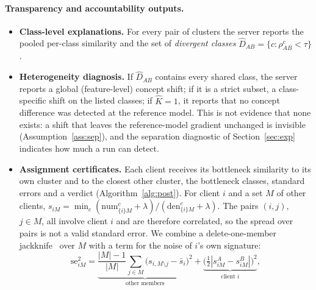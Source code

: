 \documentclass[pdflatex,sn-apa]{sn-jnl}
\theoremstyle{thmstyleone}
\theoremstyle{thmstylethree}
\begin{document}
\paragraph{Transparency and accountability outputs.}\label{sec:outputs}
\begin{itemize}[leftmargin=*,itemsep=1pt]
\item \textbf{Class-level explanations.} For every pair of clusters the server reports the pooled per-class similarity and the set of \emph{divergent classes} $\hat D_{AB}=\{c:\rho^c_{AB}<\tau\}$.
\item \textbf{Heterogeneity diagnosis.} If $\hat D_{AB}$ contains every shared class, the server reports a global (feature-level) concept shift; if it is a strict subset, a class-specific shift on the listed classes; if $\hat K=1$, it reports that no concept difference was detected at the reference model. This is not evidence that none exists: a shift that leaves the reference-model gradient unchanged is invisible (Assumption~\ref{ass:sep}), and the separation diagnostic of Section~\ref{sec:exp} indicates how much a run can detect.
\item \textbf{Assignment certificates.} Each client receives its bottleneck similarity to its own cluster and to the closest other cluster, the bottleneck classes, standard errors and a verdict (Algorithm~\ref{alg:post}). For client $i$ and a set $M$ of other clients, $s_{iM}=\min_c(\mathrm{num}^c_{\{i\}M}+\lambda)/(\mathrm{den}^c_{\{i\}M}+\lambda)$. The pairs $(i,j)$, $j\in M$, all involve client $i$ and are therefore correlated, so the spread over pairs is not a valid standard error. We combine a delete-one-member jackknife~\citep{efron1982jackknife} over $M$ with a term for the noise of $i$'s own signature:
\begin{equation}\label{eq:cert}
\mathrm{se}_{iM}^2=\underbrace{\frac{|M|-1}{|M|}\sum_{j\in M}\big(s_{i,M\setminus j}-\bar s_{i}\big)^2}_{\text{other members}}+\underbrace{\big(\tfrac12|s^{A}_{iM}-s^{B}_{iM}|\big)^2}_{\text{client }i},
\end{equation}

\end{itemize}
\end{document}
